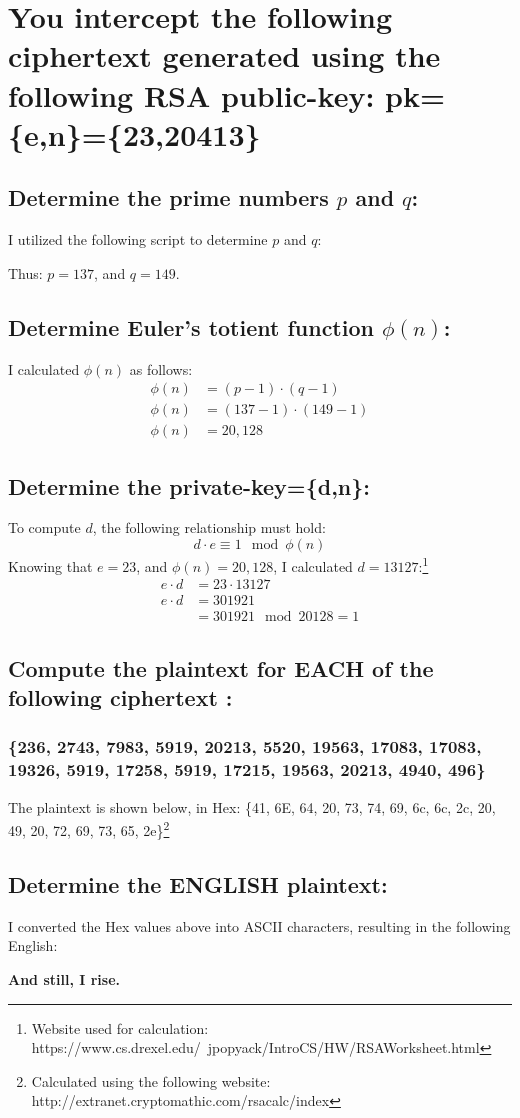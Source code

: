 \documentclass{article}
\begin{document}
\section*{You intercept the following ciphertext generated using the following RSA public-key: pk=\{e,n\}=\{23,20413\}}
\subsection*{Determine the prime numbers $p$ and $q$:}
I utilized the following script to determine $p$ and $q$:

Thus: 
$p = 137$, and $q = 149$.

\subsection*{Determine Euler's totient function $\phi(n)$:}
I calculated $\phi(n)$ as follows:
\begin{align*}
\phi(n) &= (p-1) \cdot (q-1) \\
\phi(n) &= (137 - 1) \cdot (149 - 1) \\
\phi(n) &= 20,128
\end{align*}

\subsection*{Determine the private-key=\{d,n\}:}
To compute $d$, the following relationship must hold:
\begin{equation}
d \cdot e \equiv 1 \mod{\phi(n)} 
\end{equation}
Knowing that $e=23$, and $\phi(n) = 20,128$, I calculated $d= 13127$:\footnote{Website used for calculation:  https://www.cs.drexel.edu/~jpopyack/IntroCS/HW/RSAWorksheet.html}
\begin{align*}
e \cdot d &= 23 \cdot 13127 \\
e \cdot d &= 301921 \\
			&= 301921 \mod{20128} = 1
\end{align*}

\newpage

\subsection*{Compute the plaintext for EACH of the following ciphertext :}
\subsubsection*{\{236, 2743, 7983, 5919, 20213, 5520, 19563, 17083, 17083, 19326, 5919, 17258, 5919, 17215, 19563, 20213, 4940, 496\}}

The plaintext is shown below, in Hex:
\{41, 6E, 64, 20, 73, 74, 69, 6c, 6c, 2c, 20, 49, 20, 72, 69, 73, 65, 2e\}\footnote{Calculated using the following website: http://extranet.cryptomathic.com/rsacalc/index}

\subsection*{Determine the ENGLISH plaintext:}
I converted the Hex values above into ASCII characters, resulting in the following English:

\textbf{And still, I rise.}
\end{document}
